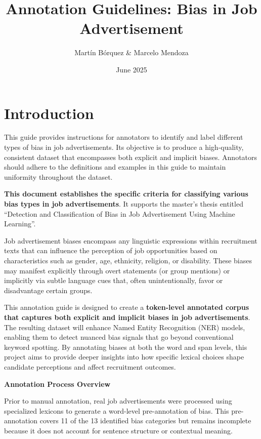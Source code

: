 \documentclass[
]{book}
\title{Annotation Guidelines: Bias in Job Advertisement}
\author{Martín Bórquez \& Marcelo Mendoza}
\date{June 2025}
\begin{document}
\maketitle

{
\setcounter{tocdepth}{1}
\tableofcontents
}
\chapter{Introduction}\label{introduction}

This guide provides instructions for annotators to identify and label different types of bias in job advertisements. Its objective is to produce a high-quality, consistent dataset that encompasses both explicit and implicit biases. Annotators should adhere to the definitions and examples in this guide to maintain uniformity throughout the dataset.

\textbf{This document establishes the specific criteria for classifying various bias types in job advertisements}. It supports the master's thesis entitled ``Detection and Classification of Bias in Job Advertisement Using Machine Learning''.

Job advertisement biases encompass any linguistic expressions within recruitment texts that can influence the perception of job opportunities based on characteristics such as gender, age, ethnicity, religion, or disability. These biases may manifest explicitly through overt statements (or group mentions) or implicitly via subtle language cues that, often unintentionally, favor or disadvantage certain groups.

This annotation guide is designed to create a \textbf{token-level annotated corpus that captures both explicit and implicit biases in job advertisements}. The resulting dataset will enhance Named Entity Recognition (NER) models, enabling them to detect nuanced bias signals that go beyond conventional keyword spotting. By annotating biases at both the word and span levels, this project aims to provide deeper insights into how specific lexical choices shape candidate perceptions and affect recruitment outcomes.

\textbf{Annotation Process Overview}

Prior to manual annotation, real job advertisements were processed using specialized lexicons to generate a word-level pre-annotation of bias. This pre-annotation covers 11 of the 13 identified bias categories but remains incomplete because it does not account for sentence structure or contextual meaning.
\end{document}
